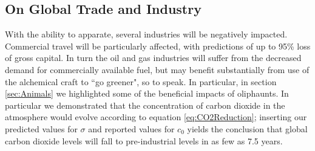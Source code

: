 \documentclass[]{article}
\begin{document}
\subsection*{On Global Trade and Industry} 
With the ability to apparate, several industries will be negatively impacted.
Commercial travel will be particularly affected, with predictions of up to 95\% loss of gross capital.
In turn the oil and gas industries will suffer from the decreased demand for commercially available fuel, but may benefit substantially from use of the alchemical craft to ``go greener", so to speak.
In particular, in section \ref{sec:Animals} we highlighted some of the beneficial impacts of oliphaunts.
In particular we demonstrated that the concentration of carbon dioxide in the atmosphere would evolve according to equation \ref{eq:CO2Reduction}; inserting our predicted values for $\sigma$ and reported values for $c_{0}$ yields the conclusion that global carbon dioxide levels will fall to pre-industrial levels in as few as 7.5 years.



\end{document}
